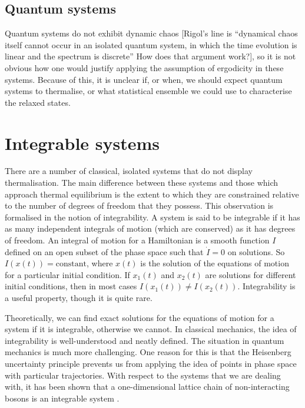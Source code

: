 \documentclass[a4paper, 10pt, draft]{article}
\theoremstyle{plain}
\begin{document}
\subsection{Quantum systems}
Quantum systems do not  exhibit dynamic chaos  [Rigol's line is ``dynamical chaos itself cannot occur in an isolated
quantum system, in which the time evolution is linear and the spectrum is
discrete'' How does that argument work?], so it is not obvious how one would
justify applying the assumption of ergodicity in these systems. Because of
this, it is unclear if, or when, we should expect quantum systems to
thermalise, or what statistical ensemble we could use to characterise the
relaxed states.


\section{Integrable systems}
There are a number of classical, isolated systems that do not display
thermalisation. The main difference between these systems and those which
approach thermal equilibrium is the extent to which they are constrained
relative to the number of degrees of freedom that they possess. This observation
is formalised in the notion of integrability. A system is said to be integrable
if it has  as
many independent integrals of motion (which are conserved) as it has degrees
of freedom. An integral of motion for a Hamiltonian is a smooth function
$I$ defined on an open subset of the phase space such that $\dot{I}=0$ on
solutions. So $I(x(t))=\text{constant}$, where $x(t)$ is the solution of the
equations of motion for a particular initial condition. If $x_1(t)$ and
$x_2(t)$ are solutions for different initial conditions, then in most cases
$I(x_1(t))\ne I(x_2(t))$. Integrability is a useful property, though it is
quite rare.

Theoretically, we can find exact solutions for the equations of motion for a
system if it is integrable, otherwise we cannot. In classical mechanics, the
idea of integrability is well-understood and neatly defined. The situation in
quantum mechanics is much more challenging. One reason for this is that
the Heisenberg uncertainty principle prevents us from applying the idea of
points in phase space with particular trajectories. With respect to the systems
that we are dealing with, it has been shown that a one-dimensional lattice
chain of non-interacting bosons is an integrable system \cite{Rigol2007}.
\end{document}
